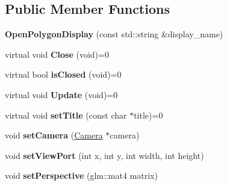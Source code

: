 \subsection*{Public Member Functions}
\begin{DoxyCompactItemize}
\item 
\hypertarget{classEngine_1_1OpenPolygonDisplay_a1ba8c36a77b37f480b3f48e59d81b7d2}{}{\bfseries Open\+Polygon\+Display} (const std\+::string \&display\+\_\+name)\label{classEngine_1_1OpenPolygonDisplay_a1ba8c36a77b37f480b3f48e59d81b7d2}

\item 
\hypertarget{classEngine_1_1OpenPolygonDisplay_ae948a2f2522ab508915786e2793cbf99}{}virtual void {\bfseries Close} (void)=0\label{classEngine_1_1OpenPolygonDisplay_ae948a2f2522ab508915786e2793cbf99}

\item 
\hypertarget{classEngine_1_1OpenPolygonDisplay_a5f46947a434abca0ed0013e5b635a950}{}virtual bool {\bfseries is\+Closed} (void)=0\label{classEngine_1_1OpenPolygonDisplay_a5f46947a434abca0ed0013e5b635a950}

\item 
\hypertarget{classEngine_1_1OpenPolygonDisplay_a6d73e3c06fc6ea13b505a4f9d3b075e1}{}virtual void {\bfseries Update} (void)=0\label{classEngine_1_1OpenPolygonDisplay_a6d73e3c06fc6ea13b505a4f9d3b075e1}

\item 
\hypertarget{classEngine_1_1OpenPolygonDisplay_adf1b620cf55e181280bb36d5cd1eda04}{}virtual void {\bfseries set\+Title} (const char $\ast$title)=0\label{classEngine_1_1OpenPolygonDisplay_adf1b620cf55e181280bb36d5cd1eda04}

\item 
\hypertarget{classEngine_1_1OpenPolygonDisplay_aae3bd963682f94241d31d580338f8d0c}{}void {\bfseries set\+Camera} (\hyperlink{classEngine_1_1Camera}{Camera} $\ast$camera)\label{classEngine_1_1OpenPolygonDisplay_aae3bd963682f94241d31d580338f8d0c}

\item 
\hypertarget{classEngine_1_1OpenPolygonDisplay_a8172ae674320280531082c0eb8df5001}{}void {\bfseries set\+View\+Port} (int x, int y, int width, int height)\label{classEngine_1_1OpenPolygonDisplay_a8172ae674320280531082c0eb8df5001}

\item 
\hypertarget{classEngine_1_1OpenPolygonDisplay_a3c4ed33ec18d81d0e5ffe1a4cadb376b}{}void {\bfseries set\+Perspective} (glm\+::mat4 matrix)\label{classEngine_1_1OpenPolygonDisplay_a3c4ed33ec18d81d0e5ffe1a4cadb376b}


\end{DoxyCompactItemize}
